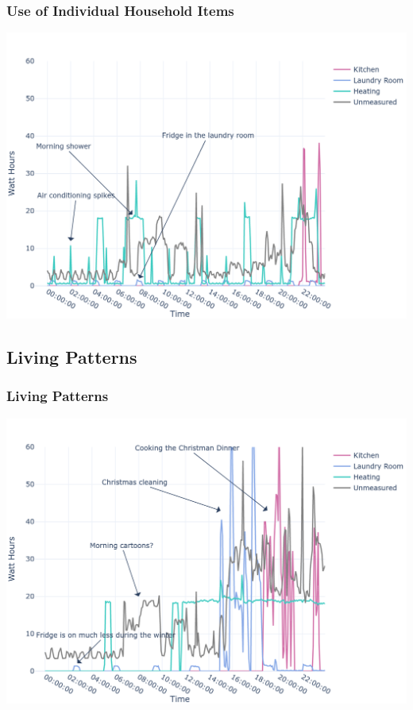 \documentclass[10pt]{beamer}
\begin{document}
\begin{frame}
\frametitle{Use of Individual Household Items}

\bigskip
{
    \centering
    \includegraphics[width=\textwidth,height=\textheight,keepaspectratio]{20080607.png}
    \par
}
\bigskip

\end{frame}

\subsection{Living Patterns}

\begin{frame}
\frametitle{Living Patterns}

\bigskip
{
    \centering
    \includegraphics[width=\textwidth,height=\textheight,keepaspectratio]{20091224.png}
    \par
}
\bigskip

\end{frame}
\end{document}
